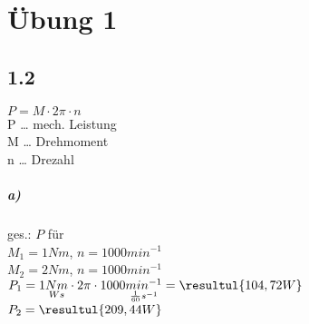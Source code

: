 \newcommand{\customDir}{../}








%



\maketitle
\newpage
\tableofcontents
\newpage

\chapter{Übung 1}

\section*{1.2}

$\boxed{P=M\cdot 2\pi \cdot n}$\\
P … mech. Leistung\\
M … Drehmoment\\
n … Drezahl
\paragraph{a)} ges.: $P$ für\\
$M_1= 1Nm$, $n=1000 min^{-1}$\\
$M_2= 2Nm$, $n=1000 min^{-1}$\vspace*{1em}\\
$P_1=1\underset{Ws}{Nm} \cdot 2\pi \cdot 1000 \underset{\frac{1}{60}s^{-1}}{min^{-1}}=\resultul{104,72W}$\\
$P_2=\resultul{209,44W}$

